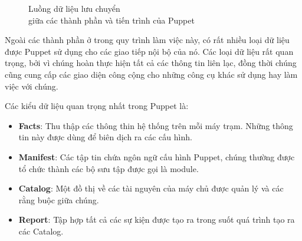 \begin{figure}[h!]
    \begin{center}
    \end{center}
    \caption{Luồng dữ liệu lưu chuyển \\ giữa các thành phần và tiến trình của Puppet}
    \label{fig:puppet_timing_diagram}
\end{figure}

Ngoài các thành phần ở trong quy trình làm việc này, có rất nhiều loại dữ liệu được Puppet sử dụng cho các giao tiếp nội bộ của nó. Các loại dữ liệu rất quan trọng, bởi vì chúng hoàn thực hiện tất cả các thông tin liên lạc, đồng thời chúng cũng cung cấp các giao diện công cộng cho những công cụ khác sử dụng hay làm việc với chúng.

Các kiểu dữ liệu quan trọng nhất trong Puppet là:

\begin{itemize}
\item \textbf{Facts}: Thu thập các thông thin hệ thống trên mỗi máy trạm. Những thông tin này được dùng để biên dịch ra các cấu hình.

\item \textbf{Manifest}: Các tập tin chứa ngôn ngữ cấu hình Puppet, chúng thường được tổ chức thành các bộ sưu tập được gọi là module.

\item \textbf{Catalog}: Một đồ thị về các tài nguyên của máy chủ được quản lý và các rằng buộc giữa chúng.

\item \textbf{Report}: Tập hợp tất cả các sự kiện được tạo ra trong suốt quá trình tạo ra các Catalog.
\end{itemize}

